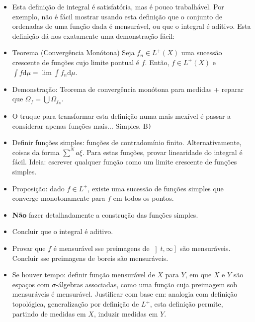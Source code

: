 \documentclass{article}
\newcommand{\dd}{\mathrm{d}}
\begin{document}
\begin{itemize}
\item Esta definição de integral é satisfatória, mas é pouco trabalhável. Por exemplo, não é fácil mostrar usando esta definição que o conjunto de ordenadas de uma função dada é mensurável, ou que o integral é aditivo. Esta definição dá-nos exatamente uma demonstração fácil:
\item Teorema (Convergência Monótona) Seja $f_n \in L^+(X)$ uma sucessão crescente de funções cujo limite pontual é $f$. Então, $f \in L^+(X)$ e $\int f \dd \mu = \lim \int f_n \dd \mu$.
\item Demonstração: Teorema de convergência monótona para medidas + reparar que $\Omega_f = \bigcup \Omega_{f_n}$.
\item O truque para transformar esta definição numa mais mexível é passar a considerar apenas funções mais... Simples. \textsf{B}\texttt{)}
\item Definir funções simples: funções de contradomínio finito. Alternativamente, coisas da forma $\sum^N a \xi$. Para estas funções, provar linearidade do integral é fácil. Ideia: escrever qualquer função como um limite crescente de funções simples.
\item Proposição: dado $f \in L^+$, existe uma sucessão de funções simples que converge monotonamente para $f$ em todos os pontos.
\item \textbf{Não} fazer detalhadamente a construção das funções simples.
\item Concluir que o integral é aditivo.
\item Provar que $f$ é mensurável sse preimagens de $\left]t,\infty\right]$ são mensuráveis. Concluir sse preimagens de boreis são mensuráveis.
\item Se houver tempo: definir função mensurável de $X$ para $Y$, em que $X$ e $Y$ são espaços com $\sigma$-álgebras associadas, como uma função cuja preimagem sob mensuráveis é mensurável. Justificar com base em: analogia com definição topológica, generalização por definição de $L^+$, esta definição permite, partindo de medidas em $X$, induzir medidas em $Y$.
\end{itemize}
\end{document}
